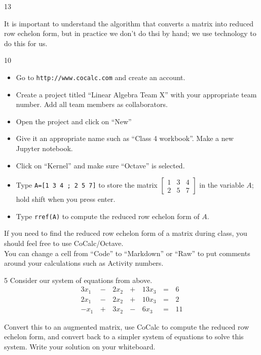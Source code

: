 \begin{applicationActivities}{1}{3}
\begin{remark}
It is important to understand the  algorithm that converts a matrix into reduced row echelon form, but in practice we don't do thsi by hand; we use technology to do this for us.
\end{remark}

\begin{activity}{10}
\begin{itemize}
\item Go to {\tt http://www.cocalc.com} and create an account.
\item Create a project titled ``Linear Algebra Team X'' with your appropriate team number.  Add all team members as collaborators.
\item Open the project and click on ``New''
\item Give it an appropriate name such as ``Class 4 workbook''.  Make a new Jupyter notebook.
\item Click on ``Kernel'' and make sure ``Octave'' is selected.
\item Type {\tt A=[1 3 4 ; 2 5 7]} to store the matrix $\begin{bmatrix} 1 & 3 & 4 \\ 2 & 5 & 7\end{bmatrix}$ in the variable $A$; hold shift when you press enter.
\item Type {\tt rref(A)} to compute the reduced row echelon form of $A$.
\end{itemize}
\end{activity}

\begin{remark}
If you need to find the reduced row echelon form of a matrix during class, you should feel free to use CoCalc/Octave.
\ \\

You can change a cell from ``Code'' to ``Markdown'' or ``Raw'' to put comments around your calculations such as Activity numbers.
\end{remark}

\begin{activity}{5}
Consider our system of equations from above.
 \[
		\begin{alignedat}{4}
   		  3x_1 &\,-\,& 2x_2 &\,+\,& 13x_3 &\,=\,& 6 \\
   		  2x_1 &\,-\,& 2x_2 &\,+\,& 10x_3 &\,=\,& 2 \\
   		  -x_1 &\,+\,& 3x_2 &\,-\,&  6x_3 &\,=\,& 11
   		\end{alignedat} 
\]

Convert this to an augmented matrix, use CoCalc to compute the reduced row echelon form, and convert back to a simpler system of equations to solve this system.  Write your solution on your whiteboard.
\end{activity}



\end{applicationActivities}
